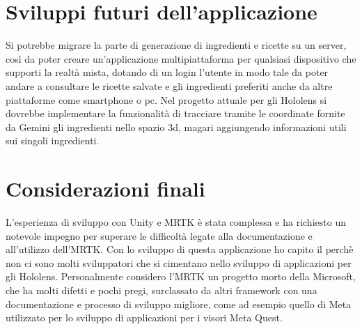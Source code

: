 \section{Sviluppi futuri dell'applicazione}
Si potrebbe migrare la parte di generazione di ingredienti e ricette su un server, così da poter creare un'applicazione multipiattaforma per qualsiasi dispositivo che supporti la realtà mista, dotando di un login l'utente in modo tale da poter andare a consultare le ricette salvate e gli ingredienti preferiti anche da altre piattaforme come smartphone o pc. Nel progetto attuale per gli Hololens si dovrebbe implementare la funzionalità di tracciare tramite le coordinate fornite da Gemini gli ingredienti nello spazio 3d, magari aggiungendo informazioni utili sui singoli ingredienti.

\section{Considerazioni finali}
L'esperienza di sviluppo con Unity e MRTK è stata complessa e ha richiesto un notevole impegno per superare le difficoltà legate alla documentazione e all'utilizzo dell'MRTK. Con lo sviluppo di questa applicazione ho capito il perchè non ci sono molti sviluppatori che si cimentano nello sviluppo di applicazioni per gli Hololens. Personalmente considero l'MRTK un progetto morto della Microsoft, che ha molti difetti e pochi pregi, surclassato da altri framework con una documentazione e processo di sviluppo migliore, come ad esempio quello di Meta utilizzato per lo sviluppo di applicazioni per i visori Meta Quest.